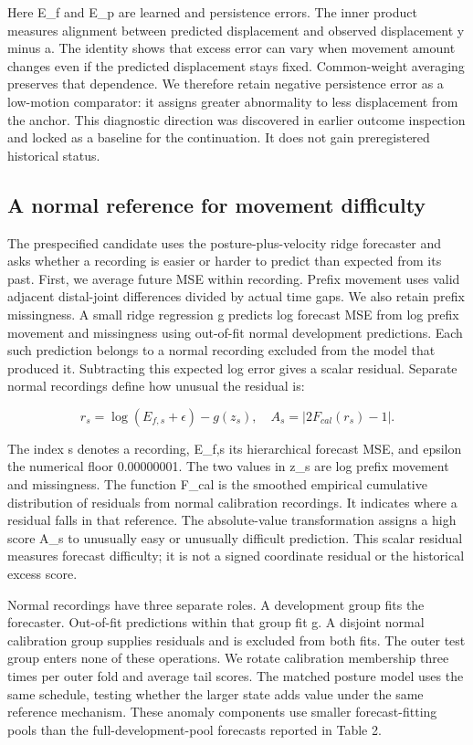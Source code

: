 \documentclass[letterpaper]{article}
\begin{document}
Here E\_f and E\_p are learned and persistence errors. The inner product measures alignment between predicted displacement and observed displacement y minus a. The identity shows that excess error can vary when movement amount changes even if the predicted displacement stays fixed. Common-weight averaging preserves that dependence. We therefore retain negative persistence error as a low-motion comparator: it assigns greater abnormality to less displacement from the anchor. This diagnostic direction was discovered in earlier outcome inspection and locked as a baseline for the continuation. It does not gain preregistered historical status.

\subsection{A normal reference for movement difficulty}

The prespecified candidate uses the posture-plus-velocity ridge forecaster and asks whether a recording is easier or harder to predict than expected from its past. First, we average future MSE within recording. Prefix movement uses valid adjacent distal-joint differences divided by actual time gaps. We also retain prefix missingness. A small ridge regression g predicts log forecast MSE from log prefix movement and missingness using out-of-fit normal development predictions. Each such prediction belongs to a normal recording excluded from the model that produced it. Subtracting this expected log error gives a scalar residual. Separate normal recordings define how unusual the residual is:

\begin{equation}r_s=\log(E_{f,s}+\epsilon)-g(z_s),\quad A_s=|2F_{cal}(r_s)-1|.\end{equation}

The index s denotes a recording, E\_f,s its hierarchical forecast MSE, and epsilon the numerical floor 0.00000001. The two values in z\_s are log prefix movement and missingness. The function F\_cal is the smoothed empirical cumulative distribution of residuals from normal calibration recordings. It indicates where a residual falls in that reference. The absolute-value transformation assigns a high score A\_s to unusually easy or unusually difficult prediction. This scalar residual measures forecast difficulty; it is not a signed coordinate residual or the historical excess score.

Normal recordings have three separate roles. A development group fits the forecaster. Out-of-fit predictions within that group fit g. A disjoint normal calibration group supplies residuals and is excluded from both fits. The outer test group enters none of these operations. We rotate calibration membership three times per outer fold and average tail scores. The matched posture model uses the same schedule, testing whether the larger state adds value under the same reference mechanism. These anomaly components use smaller forecast-fitting pools than the full-development-pool forecasts reported in Table 2.
\end{document}

